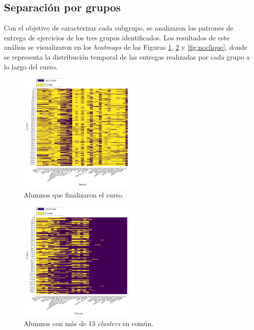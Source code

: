 \documentclass[11pt,a4paper,twoside,openany]{tesis}
\begin{document}
\subsection{Separación por grupos}\textbf{ }

Con el objetivo de caracterizar cada subgrupo, se analizaron los patrones de entrega de ejercicios de los tres grupos identificados. Los resultados de este análisis se visualizaron en los \emph{heatmaps} de las Figuras \ref{fig:final}, \ref{fig:clique} y \ref{fig:noclique}, donde se representa la distribución temporal de las entregas realizadas por cada grupo a lo largo del curso.
\newpage

\begin{figure}[H]
\centering
\includegraphics[width=0.5\textwidth]{imagenes/entregas - finalizados.png}
\caption{Alumnos que finalizaron el curso.}
\label{fig:final}
\end{figure}

\begin{figure}[H]
\centering
\includegraphics[width=0.5\textwidth]{imagenes/entregas - clique13.png}
\caption{Alumnos con más de 13 \emph{clusters} en común.}
\label{fig:clique}
\end{figure}
\end{document}
